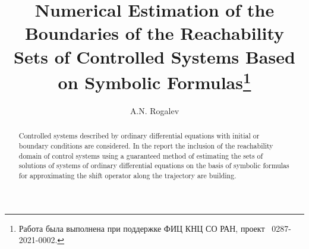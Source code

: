 \begin{englishtitle} %
\title{Numerical Estimation of the Boundaries of the Reachability Sets of Controlled Systems Based on Symbolic Formulas\thanks{
Работа была выполнена при поддержке ФИЦ КНЦ СО РАН, проект \textnumero~0287-2021-0002.} }
\author{A.N. Rogalev  
}
\maketitle
\begin{abstract}
Controlled systems described by ordinary differential equations with initial or boundary conditions are considered.  In the report  the inclusion of the reachability domain of control systems using a guaranteed method of estimating the sets of solutions of systems of ordinary differential equations on the basis of symbolic formulas for approximating the shift operator along the trajectory are building.

\end{abstract}
\end{englishtitle}

\iffalse

%
%

